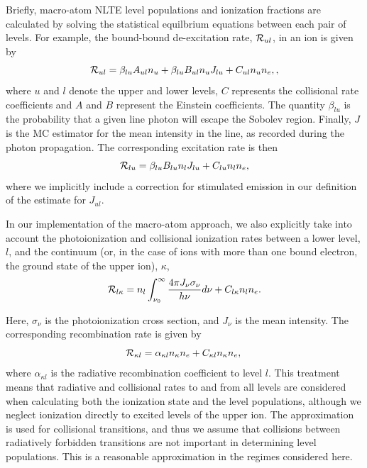 \documentclass[preprint, a4paper, 11pt]{aastex}
\begin{document}
Briefly, macro-atom NLTE level populations and ionization fractions
are calculated by solving the statistical equilbrium equations between
each pair of levels. For example, the bound-bound de-excitation rate,
${\cal R}_{ul}$, in an ion is given by  
\begin{equation}
{\cal R}_{ul} = \beta_{lu} A_{ul} n_u + \beta_{lu} B_{ul} n_u J_{lu} +
C_{ul} n_u n_e,\label{eq:nlte_rul},
\end{equation}
where $u$ and $l$ denote the upper and lower levels, $C$ represents the
collisional rate coefficients and $A$ and $B$ represent the Einstein
coefficients. The quantity $\beta_{lu}$ is the probability that a
given line photon will escape the Sobolev region. Finally, $J$ is the
MC estimator for the mean intensity in the line, as recorded during
the photon propagation. The corresponding excitation rate is then 
\begin{equation}
{\cal R}_{lu} = \beta_{lu} B_{lu} n_l J_{lu} + C_{lu} n_l n_e,
\end{equation}
where we implicitly include a correction for stimulated emission in
our definition of the estimate for $J_{ul}$. 

In our implementation of the macro-atom approach, we also explicitly
take into account the photoionization and collisional ionization rates
between a lower level, $l$, and the continuum (or, in the case of ions
with more than one bound electron, the ground state of the upper ion),
$\kappa$,
\begin{equation}
{\cal R}_{l \kappa}= n_l \int_{\nu_0}^{\infty} \frac{ 4 \pi J_{\nu}
  \sigma_{\nu}}{h \nu} d\nu + C_{l \kappa} n_l n_e.
\end{equation}

Here, $\sigma_{\nu}$ is the photoionization cross section, and $J_{\nu}$
is the mean intensity. The corresponding recombination rate is given
by 
\begin{equation}
{\cal R}_{\kappa l} = \alpha_{\kappa l} n_{\kappa} n_e + C_{\kappa l}
n_\kappa n_e, \\
\end{equation}
where $\alpha_{\kappa l}$ is the radiative recombination coefficient
to level $l$. This treatment means that radiative and collisional
rates to and from all levels are considered when calculating both the
ionization state and the level populations, although we neglect 
ionization directly to excited levels of the upper ion. The
\cite{vanregemorter} approximation is used for collisional
transitions, and thus we assume that collisions between radiatively
forbidden transitions are not important in determining level
populations. This is a reasonable approximation in the regimes
considered here.
\end{document}
